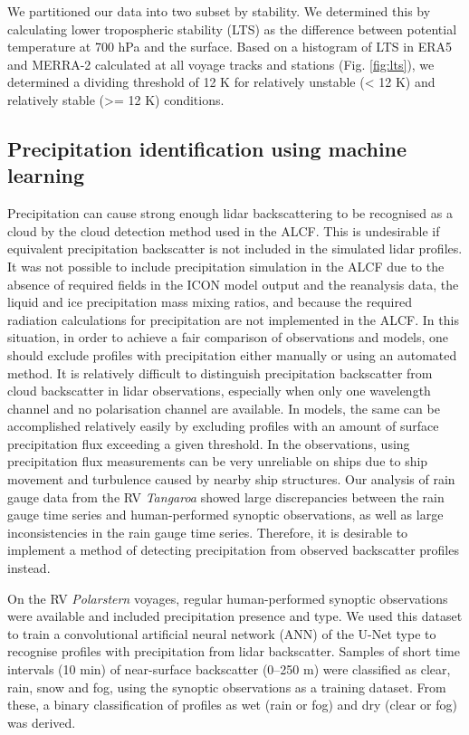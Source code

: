 \documentclass[12pt,a4paper]{article}
\begin{document}
We partitioned our data into two subset by stability. We determined this by
calculating lower tropospheric stability (LTS) as the difference between
potential temperature at 700 hPa and the surface.  Based on a histogram of LTS
in ERA5 and MERRA-2 calculated at all voyage tracks and stations (Fig.
\ref{fig:lts}), we determined a dividing threshold of 12 K for relatively
unstable (< 12 K) and relatively stable (>= 12 K) conditions.

\subsection{Precipitation identification using machine learning}
\label{sec:ann}

Precipitation can cause strong enough lidar backscattering to be recognised as
a cloud by the cloud detection method used in the ALCF. This is undesirable
if equivalent precipitation backscatter is not included in the simulated lidar
profiles. It was not possible to include precipitation simulation in the ALCF
due to the absence of required fields in the ICON model output and the
reanalysis data, the liquid and ice precipitation mass mixing ratios, and
because the required radiation calculations for precipitation are not
implemented in the ALCF. In this situation, in order to achieve a fair
comparison of observations and models, one should exclude profiles with
precipitation either manually or using an automated method. It is relatively
difficult to distinguish precipitation backscatter from cloud backscatter in
lidar observations, especially when only one wavelength channel and no
polarisation channel are available. In models, the same can be accomplished
relatively easily by excluding profiles with an amount of surface precipitation
flux exceeding a given threshold. In the observations, using precipitation
flux measurements can be very unreliable on ships due to ship movement and
turbulence caused by nearby ship structures. Our analysis of rain gauge data
from the RV \emph{Tangaroa} showed large discrepancies between the rain gauge
time series and human-performed synoptic observations, as well as large
inconsistencies in the rain gauge time series. Therefore, it is desirable to
implement a method of detecting precipitation from observed backscatter
profiles instead.

On the RV \emph{Polarstern} voyages, regular human-performed synoptic
observations were available and included precipitation presence and type. We
used this dataset to train a convolutional artiﬁcial neural network (ANN) of
the U-Net type \citep{ronneberger2015} to recognise profiles with precipitation
from lidar backscatter. Samples of short time intervals (10 min) of
near-surface backscatter (0–250 m) were classified as clear, rain, snow and
fog, using the synoptic observations as a training dataset. From these, a
binary classification of profiles as wet (rain or fog) and dry (clear or fog)
was derived.
\end{document}
